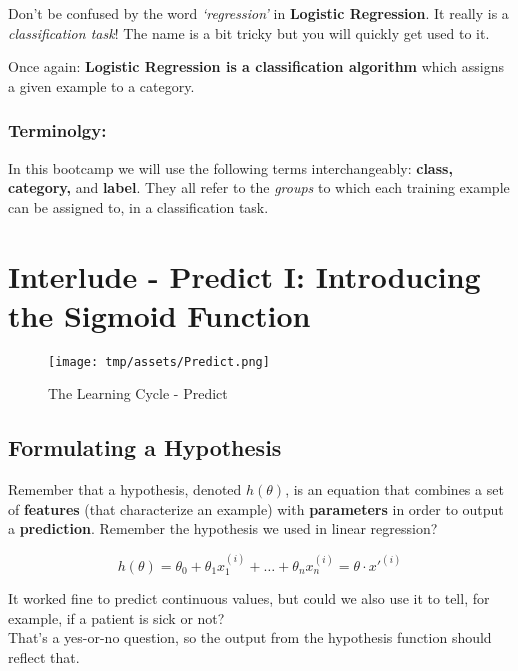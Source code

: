 \documentclass[]{article}
\begin{document}
Don't be confused by the word \emph{`regression'} in \textbf{Logistic
Regression}. It really is a \emph{classification task}! The name is a
bit tricky but you will quickly get used to it.

Once again: \textbf{Logistic Regression is a classification algorithm}
which assigns a given example to a category.

\hypertarget{terminolgy}{%
\subsubsection{\texorpdfstring{\textbf{Terminolgy:}}{Terminolgy:}}\label{terminolgy}}

In this bootcamp we will use the following terms interchangeably:
\textbf{class, category,} and \textbf{label}. They all refer to the
\emph{groups} to which each training example can be assigned to, in a
classification task. \clearpage

\hypertarget{interlude---predict-i-introducing-the-sigmoid-function-1}{%
\section{Interlude - Predict I: Introducing the Sigmoid
Function}\label{interlude---predict-i-introducing-the-sigmoid-function-1}}

\begin{figure}
\centering
\texttt{[image: tmp/assets/Predict.png]}
\caption{The Learning Cycle - Predict}
\end{figure}

\hypertarget{formulating-a-hypothesis}{%
\subsection{Formulating a Hypothesis}\label{formulating-a-hypothesis}}

Remember that a hypothesis, denoted \(h(\theta)\), is an equation that
combines a set of \textbf{features} (that characterize an example) with
\textbf{parameters} in order to output a \textbf{prediction}. Remember
the hypothesis we used in linear regression?

\large

\[
h(\theta) = \theta_0 + \theta_{1} x_{1}^{(i)} + \dots + \theta_{n} x_{n}^{(i)} = \theta \cdot x'^{(i)}
\] \normalsize

It worked fine to predict continuous values, but could we also use it to
tell, for example, if a patient is sick or not?\\
That's a yes-or-no question, so the output from the hypothesis function
should reflect that.
\end{document}
